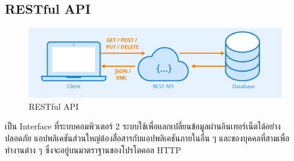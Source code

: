 \documentclass[12pt,oneside,openright,a4paper]{cpe-thai-project}
\begin{document}
  \subsection{RESTful API}

    \begin{figure}[!ht]\centering
      \includegraphics[width=13cm]{./img/rest.png}
      \caption{RESTful API}\label{fig:api}
    \end{figure}

    \hspace{1cm}เป็น Interface ที่ระบบคอมพิวเตอร์ 2 ระบบใช้เพื่อแลกเปลี่ยนข้อมูลผ่านอินเทอร์เน็ตได้อย่างปลอดภัย 
    แอปพลิเคชันส่วนใหญ่ต้องสื่อสารกับแอปพลิเคชันภายในอื่น ๆ และของบุคคลที่สามเพื่อทำงานต่าง ๆ ซึ่งจะอยู่บนมาตราฐานของโปรโตคอล HTTP \cite{api} 
    
\end{document}
